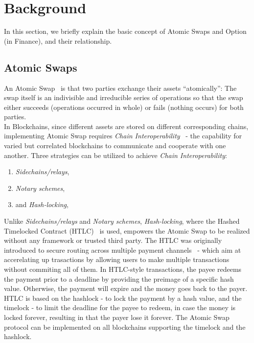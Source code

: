 \section{Background}
\label{sec:background}

In this section, we briefly explain the basic concept of Atomic Swaps and Option (in Finance), and their relationship.

\subsection{Atomic Swaps}

An Atomic Swap~\cite{nolan2013alt} is that two parties exchange their assets ``atomically'':
The swap itself is an indivisible and irreducible series of operations so that the swap either succeeds (operations occurred in whole) or fails (nothing occurs) for both parties. \\

In Blockchains, since different assets are stored on different corresponding chains, implementing Atomic Swap requires \textit{Chain Interoperability}~\cite{buterin2016chain} - the capability for varied but correlated blockchains to communicate and cooperate with one another.
Three strategies can be utilized to achieve \textit{Chain Interoperability}:\\

\begin{enumerate}
    \item \textit{Sidechains/relays},
    \item \textit{Notary schemes},
    \item and \textit{Hash-locking},\\
\end{enumerate}

Unlike \textit{Sidechains/relays} and \textit{Notary schemes}, \textit{Hash-locking}, where the Hashed Timelocked Contract (HTLC)~\cite{poon2016bitcoin} is used, empowers the Atomic Swap to be realized without any framework or trusted third party. The HTLC was originally introduced to secure routing across multiple payment channels~\cite{paychannel2018btcwiki} - which aim at accerelating up trasactions by allowing users to make multiple transactions without commiting all of them.
In HTLC-style transactions, the payee redeems the payment prior to a deadline by providing the preimage of a specific hash value.
Otherwise, the payment will expire and the money goes back to the payer.
HTLC is based on the hashlock - to lock the payment by a hash value, and the timelock - to limit the deadline for the payee to redeem, in case the money is locked forever, resulting in that the payer lose it forever.
The Atomic Swap protocol can be implemented on all blockchains supporting the timelock and the hashlock.

